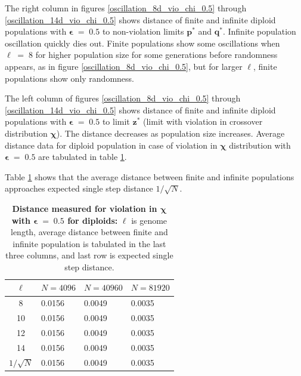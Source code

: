 
The right column in figures \ref{oscillation_8d_vio_chi_0.5} through \ref{oscillation_14d_vio_chi_0.5} 
shows distance of finite and infinite diploid populations with $\bm{\epsilon} \;=\; 0.5$ to non-violation limits $\bm{p^\ast}$ and $\bm{q^\ast}$. 
Infinite population oscillation quickly dies out. 
Finite populations show some oscillations when $\ell \;=\; 8$ for higher population size for some generations 
before randomness appears, as in figure \ref{oscillation_8d_vio_chi_0.5}, but 
for larger $\ell$, finite populations show only randomness. 

The left column of figures \ref{oscillation_8d_vio_chi_0.5} through \ref{oscillation_14d_vio_chi_0.5} 
shows distance of finite and infinite diploid populations with $\bm{\epsilon} \;=\; 0.5$ to limit $\bm{z^\ast}$ 
(limit with violation in crossover distribution $\bm{\chi}$). 
The distance decreases as population size increases.
Average distance data for diploid population in case of violation in $\bm{\chi}$ distribution 
with $\bm{\epsilon} \;=\; 0.5$ are tabulated in table \ref{distanceChiDipEps0.5}.

Table \ref{distanceChiDipEps0.5} shows that the average distance 
between finite and infinite populations approaches expected single step distance $1/\sqrt{N}$. 

\clearpage
\begin{table}[h]
\caption[\textbf{Distance measured for violation in $\bm{\chi}$ with $\bm{\epsilon} \;=\; 0.5$ for diploids}]{\textbf{Distance measured for violation in $\bm{\chi}$ with $\bm{\epsilon} \;=\; 0.5$ for diploids:} $\ell$ is genome length, 
average distance between finite and infinite population is tabulated in the last three columns, and last row is expected single step distance.}
\centering
\begin{tabularx}{0.75\textwidth}{ c *{3}{X}}
\toprule
$\ell$ & $N = 4096$ & $N = 40960$ & $N = 81920$  \\
\midrule
8 & 0.0156	&  0.0049	& 0.0035 \\	
10 & 0.0156	&  0.0049	& 0.0035 \\
12 & 0.0156	&  0.0049	& 0.0035 \\
14 & 0.0156	&  0.0049	& 0.0035 \\
\midrule
$1/\sqrt{N}$ & 0.0156 & 0.0049 & 0.0035 \\
\bottomrule
\end{tabularx}
\label{distanceChiDipEps0.5}
\end{table} 


 
